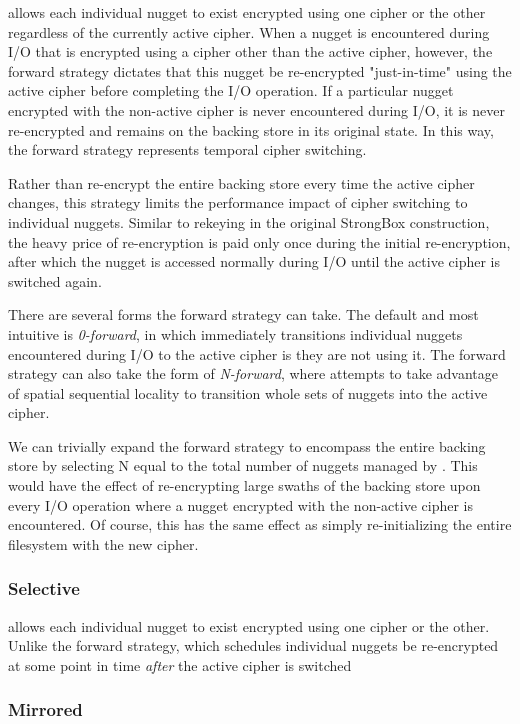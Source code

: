 \SYSTEM{} allows each individual nugget to exist encrypted using one cipher or
the other regardless of the currently active cipher. When a nugget is
encountered during I/O that is encrypted using a cipher other than the active
cipher, however, the forward strategy dictates that this nugget be re-encrypted
"just-in-time" using the active cipher before completing the I/O operation. If a
particular nugget encrypted with the non-active cipher is never encountered
during I/O, it is never re-encrypted and remains on the backing store in its
original state. In this way, the forward strategy represents temporal cipher
switching.

Rather than re-encrypt the entire backing store every time the active cipher
changes, this strategy limits the performance impact of cipher switching to
individual nuggets. Similar to rekeying in the original StrongBox construction,
the heavy price of re-encryption is paid only once during the initial
re-encryption, after which the nugget is accessed normally during I/O until the
active cipher is switched again.

There are several forms the forward strategy can take. The default and most
intuitive is \emph{0-forward}, in which \SYSTEM{} immediately transitions
individual nuggets encountered during I/O to the active cipher is they are not
using it. The forward strategy can also take the form of \emph{N-forward}, where
\SYSTEM{} attempts to take advantage of spatial sequential locality to
transition whole sets of nuggets into the active cipher.

We can trivially expand the forward strategy to encompass the entire backing
store by selecting N equal to the total number of nuggets managed by \SYSTEM{}.
This would have the effect of re-encrypting large swaths of the backing store
upon every I/O operation where a nugget encrypted with the non-active cipher is
encountered. Of course, this has the same effect as simply re-initializing the
entire filesystem with the new cipher.

\subsubsection{Selective}

\SYSTEM{} allows each individual nugget to exist encrypted using one cipher or
the other. Unlike the forward strategy, which schedules individual nuggets be
re-encrypted at some point in time \emph{after} the active cipher is switched

\subsubsection{Mirrored}

